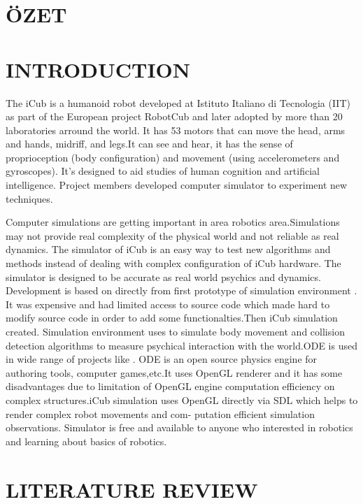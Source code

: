 \documentclass[a4paper, 12pt]{report}
\begin{document}
  \chapter*{ÖZET}
  
  \chapter{INTRODUCTION}
  
  The iCub is a humanoid robot developed at Istituto Italiano di Tecnologia 
  (IIT) 
  as part of the European project RobotCub and later adopted by more than 20 
  laboratories arround the world. It has 53 motors that can move the head, arms 
  and hands, midriff, and legs.It can see and hear, it has the sense of 
  proprioception (body 
  configuration) and movement (using accelerometers and gyroscopes).
  It’s designed to aid studies of human cognition and artificial 
  intelligence. Project members developed computer simulator to experiment new 
  techniques.
  \par Computer simulations are getting important in area robotics 
  area.Simulations may not provide real complexity of the physical world and 
  not 
  reliable as real dynamics. The simulator of iCub is an easy way to test new 
  algorithms and methods instead of dealing with complex configuration of iCub 
  hardware. The simulator is designed to be accurate as real world psychics and 
  dynamics. Development is based on directly from first prototype of simulation 
  environment \cite{Webots}. It was expensive and had limited access to 
  source code which made hard to modify source code in order to add some 
  functionalties.Then iCub simulation created. Simulation environment uses 
  \cite{ODE} to simulate body movement and collision detection algorithms to 
  measure psychical interaction with the world.ODE is used in wide range of 
  projects like \cite{Gazebo}. ODE is an open source physics engine for 
  authoring tools, computer 
  games,etc.It uses OpenGL renderer and it has some disadvantages due to 
  limitation of OpenGL engine computation efficiency on complex structures.iCub 
  simulation uses OpenGL directly via SDL which helps to render complex robot 
  movements and com- putation efficient simulation observations. Simulator is 
  free and available to anyone who interested in robotics and learning about 
  basics of robotics.
  
  
  \chapter{LITERATURE REVIEW}
  
\end{document}
